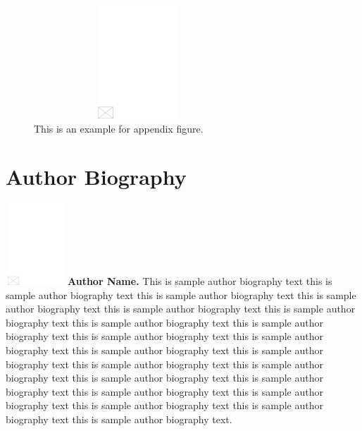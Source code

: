 \documentclass[AMA,STIX1COL]{WileyNJD-v2}
\begin{document}
\begin{figure}[t]
\centerline{\includegraphics[height=10pc,width=78mm,draft]{empty}}
\caption{This is an example for appendix figure.\label{fig5}}
\end{figure}


\nocite{*}%
%

\clearpage

\section*{Author Biography}

\begin{biography}{\includegraphics[width=66pt,height=86pt,draft]{empty}}{\textbf{Author Name.} This is sample author biography text this is sample author biography text this is sample author biography text this is sample author biography text this is sample author biography text this is sample author biography text this is sample author biography text this is sample author biography text this is sample author biography text this is sample author biography text this is sample author biography text this is sample author biography text this is sample author biography text this is sample author biography text this is sample author biography text this is sample author biography text this is sample author biography text this is sample author biography text this is sample author biography text this is sample author biography text this is sample author biography text.}
\end{biography}
\end{document}
